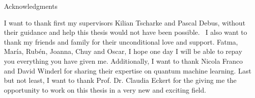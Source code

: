 \thispagestyle{empty}

\vspace*{20mm}

\begin{center}
    { Acknowledgments}
\end{center}

\vspace{10mm}

I want to thank first my supervisors Kilian Tscharke and Pascal Debus,
without their guidance and help this thesis would not have been possible. \
I also want to thank my friends and family for their unconditional
love and support. Fatma, María, Rubén, Joanna, Chuy and Oscar, I hope one
day I will be able to repay you everything you have given me. Additionally,
I want to thank Nicola Franco and David Winderl for sharing their expertise
on quantum machine learning. Last but not least, I want to thank Prof. Dr.
Claudia Eckert for the giving me the opportunity to work on this thesis
in a very new and exciting field. 

\cleardoublepage{}

